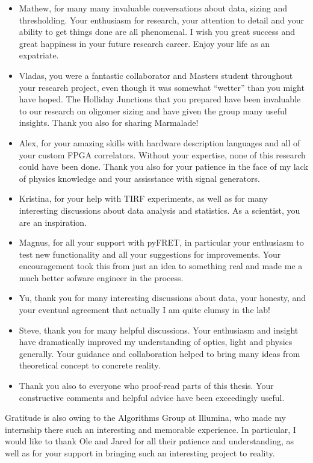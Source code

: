 \begin{itemize}
\item[] Mathew, for many many invaluable conversations about data, sizing and thresholding. Your enthusiasm for research, your attention to detail and your ability to get things done are all phenomenal. I wish you great success and great happiness in your future research career. Enjoy your life as an expatriate.
\item[] Vladas, you were a fantastic collaborator and Masters student throughout your research project, even though it was somewhat ``wetter'' than you might have hoped. The Holliday Junctions that you prepared have been invaluable to our research on oligomer sizing and have given the group many useful insights. Thank you also for sharing Marmalade!
\item[] Alex, for your amazing skills with hardware description languages and all of your custom FPGA correlators. Without your expertise, none of this research could have been done. Thank you also for your patience in the face of my lack of physics knowledge and your assisstance with signal generators.
\item[] Kristina, for your help with TIRF experiments, as well as for many interesting discussions about data analysis and statistics. As a scientist, you are an inspiration.
\item[] Magnus, for all your support with pyFRET, in particular your enthusiasm to test new functionality and all your suggestions for improvements. Your encouragement took this from just an idea to something real and made me a much better sofware engineer in the process.
\item[] Yu, thank you for many interesting discussions about data, your honesty, and your eventual agreement that actually I am quite clumsy in the lab!
\item[] Steve, thank you for many helpful discussions. Your enthusiasm and insight have dramatically improved my understanding of optics, light and physics generally. Your guidance and collaboration helped to bring many ideas from theoretical concept to concrete reality.
\item[] Thank you also to everyone who proof-read parts of this thesis. Your constructive comments and helpful advice have been exceedingly useful.
\end{itemize}

Gratitude is also owing to the Algorithms Group at Illumina, who made my internship there such an interesting and memorable experience. In particular, I would like to thank Ole and Jared for all their patience and understanding, as well as for your support in bringing such an interesting project to reality.

